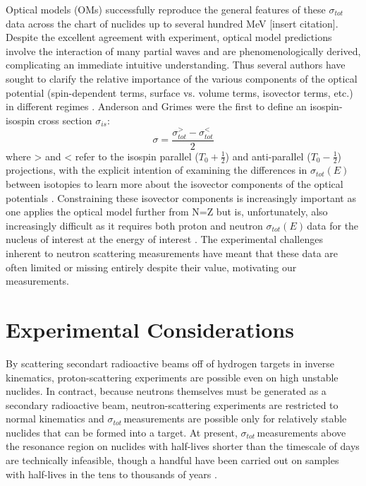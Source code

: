 \documentclass[twocolumn,secnumarabic,amssymb, nobibnotes, aps, prl,
superscriptaddress, nobalancelastpage]{revtex4}
\newcommand{\tots}{\ensuremath{\sigma_{tot}}\,}
\newcommand{\totEs}{\ensuremath{\sigma_{tot}(E)\,}}
\begin{document}
Optical models (OMs) successfully reproduce the general features of these \tots
data across the chart of nuclides up to several hundred MeV [insert citation].
Despite the excellent agreement with experiment, optical model predictions
involve the interaction of many partial waves and are phenomenologically
derived, complicating an immediate intuitive understanding. Thus several authors
have sought to clarify the relative importance of the various components of the
optical potential (spin-dependent terms, surface vs. volume terms, isovector
terms, etc.) in different regimes \cite{Gould1986, Hodgson1967, Satchler1967}.
Anderson and Grimes were the first to define an isospin-isospin cross section
$\sigma_{is}$:
\begin{equation}
    \sigma = \frac{\sigma_{tot}^{>} - \sigma_{tot}^{<}}{2}
\end{equation}
where > and < refer to the isospin parallel ($T_0 + \frac{1}{2}$) and
anti-parallel ($T_0 - \frac{1}{2}$) projections, with the explicit intention of
examining the differences in \totEs between isotopies to learn more about the
isovector components of the optical potentials \cite{Anderson1990}.
Constraining these isovector components is increasingly important as one applies
the optical model further from N=Z but is, unfortunately, also increasingly
difficult as it requires both proton and neutron \totEs data for the nucleus of
interest at the energy of interest \cite{}. The experimental challenges inherent
to neutron scattering measurements have meant that these data are often limited
or missing entirely despite their value, motivating our measurements.

\section{Experimental Considerations}
By scattering secondart radioactive beams off of hydrogen targets in inverse
kinematics, proton-scattering experiments are possible even on high unstable
nuclides. In contract, because neutrons themselves must be generated as a
secondary radioactive beam, neutron-scattering experiments are restricted to
normal kinematics and \tots measurements are possible only for relatively stable
nuclides that can be formed into a target. At present, \tots measurements above
the resonance region on nuclides with half-lives shorter than the timescale of
days are technically infeasible, though a handful have been carried out on
samples with half-lives in the tens to thousands of years \cite{Poenitz1983,
Phillips1980, Foster1971}.
\end{document}
